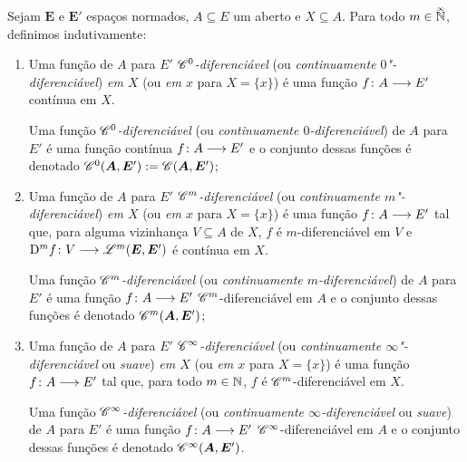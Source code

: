 \begin{comment}
	Uma função \emph{$\Cont^\infty$-diferenciável} (ou \emph{continuamente $\infty$-diferenciável} ou \emph{suave}) de $A$ para $E'$ é uma função $\fun{f}{A}{E'}$ $\Cont^{\infty}$-diferenciável em $A$ e o conjunto dessas funções é denotado $\Cont^\infty(\bm A,\bm E')$.
	\end{enumerate}
\end{definition}
\end{comment}

\begin{definition}
Sejam $\bm E$ e $\bm E'$ espaços normados, $A \subseteq E$ um aberto e $X \subseteq A$. Para todo $m \in \accentset{\infty}{\mathbb{N}}$, definimos indutivamente:
	\begin{enumerate}
	\item Uma função de $A$ para $E'$ \emph{$\mathscr{C}^0$-diferenciável} (ou \emph{continuamente $0$"-diferenciável}) \emph{em $X$} (ou \emph{em $x$} para $X = \{x\}$) é uma função $f\colon \allowbreak A \longrightarrow E'$ contínua em $X$.

	Uma função \emph{$\mathscr{C}^0$-diferenciável} (ou \emph{continuamente $0$-diferenciável}) de $A$ para $E'$ é uma função contínua $f\colon \allowbreak A \longrightarrow E'$ e o conjunto dessas funções é denotado $\mathscr{C}^0(\bm A,\bm E') := \mathscr{C}(\bm A,\bm E')$;

	\item Uma função de $A$ para $E'$ \emph{$\mathscr{C}^m$-diferenciável} (ou \emph{continuamente $m$"-diferenciável}) \emph{em $X$} (ou \emph{em $x$} para $X = \{x\}$) é uma função $f\colon \allowbreak A \longrightarrow E'$ tal que, para alguma vizinhança $V \subseteq A$ de $X$, $f$ é $m$-diferenciável em $V$ e %
	$\mathrm{D}^m f\colon \allowbreak V \longrightarrow \mathscr{L}^m(\bm E, \bm E')$ é contínua em $X$.

	Uma função \emph{$\mathscr{C}^m$-diferenciável} (ou \emph{continuamente $m$-diferenciável}) de $A$ para $E'$ é uma função $f\colon \allowbreak A \longrightarrow E'$ $\mathscr{C}^m$-diferenciável em $A$ e o conjunto dessas funções é denotado $\mathscr{C}^m(\bm A,\bm E')$;

	\item Uma função de $A$ para $E'$ \emph{$\mathscr{C}^\infty$-diferenciável} (ou \emph{continuamente $\infty$"-diferenciável} ou \emph{suave}) \emph{em $X$} (ou \emph{em $x$} para $X = \{x\}$) é uma função $f\colon \allowbreak A \longrightarrow E'$ tal que, para todo $m \in \mathbb{N}$, $f$ é $\mathscr{C}^{m}$-diferenciável em $X$.

	Uma função \emph{$\mathscr{C}^\infty$-diferenciável} (ou \emph{continuamente $\infty$-diferenciável} ou \emph{suave}) de $A$ para $E'$ é uma função $f\colon \allowbreak A \longrightarrow E'$ $\mathscr{C}^{\infty}$-diferenciável em $A$ e o conjunto dessas funções é denotado $\mathscr{C}^\infty(\bm A,\bm E')$.
	\end{enumerate}
\end{definition}

